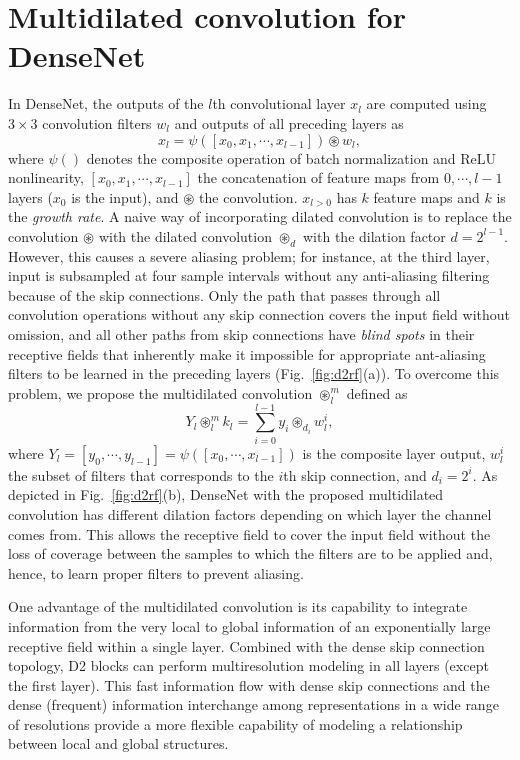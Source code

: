 \documentclass[final]{cvpr}
\begin{document}
\section{Multidilated convolution for DenseNet}
\label{sec:d2}
In DenseNet, the outputs of the $l$th convolutional layer $x_l$ are computed using $3\times3$ convolution filters $w_l$ and outputs of all preceding layers as
\begin{equation}
x_l = \psi([x_0, x_1, \cdots, x_{l-1}]) \circledast w_l,
\end{equation}
where $\psi()$ denotes the composite operation of batch normalization and ReLU nonlinearity, $[x_0, x_1, \cdots, x_{l-1}]$ the concatenation of feature maps from $0, \cdots, l-1$ layers ($x_0$ is the input), and $\circledast$ the convolution. $x_{l>0}$ has $k$ feature maps and $k$ is the \textit{growth rate}.
A naive way of incorporating dilated convolution is to replace the convolution $\circledast$ with the dilated convolution $\circledast_d$ with the dilation factor $d=2^{l-1}$. However, this causes a severe aliasing problem; for instance, at the third layer, input is subsampled at four sample intervals without any anti-aliasing filtering because of the skip connections. Only the path that passes through all convolution operations without any skip connection covers the input field without omission, and all other paths from skip connections have \textit{blind spots} in their receptive fields that inherently make it impossible for appropriate ant-aliasing filters to be learned in the preceding layers (Fig.~\ref{fig:d2rf}(a)). 
To overcome this problem, we propose the multidilated convolution $\circledast^m_l$ defined as
\begin{equation}
Y_l \circledast^m_l k_l = \sum_{i=0}^{l-1} y_i \circledast_{d_i} w^i_l,
\end{equation}
where $Y_l = [y_0, \cdots, y_{l-1}] = \psi([x_0, \cdots, x_{l-1}])$ is the composite layer output,  $w^i_l$ the subset of filters that corresponds to the $i$th skip connection, and $d_i = 2^i$. As depicted in Fig.~\ref{fig:d2rf}(b), DenseNet with the proposed multidilated convolution has different dilation factors depending on which layer the channel comes from. This allows the receptive field to cover the input field without the loss of coverage between the samples to which the filters are to be applied and, hence, to learn proper filters to prevent aliasing. 

One advantage of the multidilated convolution is its capability to integrate information from the very local to global information of an exponentially large receptive field within a single layer. Combined with the dense skip connection topology, D2 blocks can perform multiresolution modeling in all layers (except the first layer). 
This fast information flow with dense skip connections and the dense (frequent) information interchange among representations in a wide range of resolutions provide a more flexible capability of modeling a relationship between local and global structures.
\end{document}
